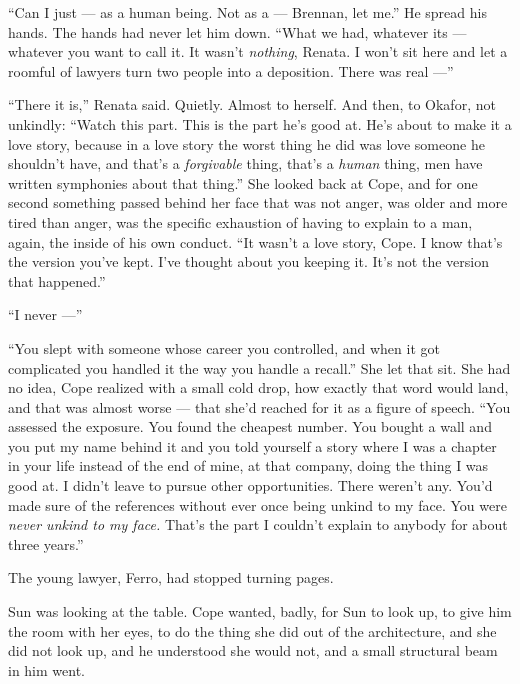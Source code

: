 \documentclass[11pt,openany]{book}
\newcommand{\scenebreak}{\par\vspace{0.5\baselineskip}\begin{center}\textasteriskcentered\quad\textasteriskcentered\quad\textasteriskcentered\end{center}\vspace{0.5\baselineskip}\par}
\begin{document}
``Can I just --- as a human being. Not as a --- Brennan, let me.'' He spread his hands. The hands had never let him down. ``What we had, whatever its --- whatever you want to call it. It wasn't \textit{nothing}, Renata. I won't sit here and let a roomful of lawyers turn two people into a deposition. There was real ---''

``There it is,'' Renata said. Quietly. Almost to herself. And then, to Okafor, not unkindly: ``Watch this part. This is the part he's good at. He's about to make it a love story, because in a love story the worst thing he did was love someone he shouldn't have, and that's a \textit{forgivable} thing, that's a \textit{human} thing, men have written symphonies about that thing.'' She looked back at Cope, and for one second something passed behind her face that was not anger, was older and more tired than anger, was the specific exhaustion of having to explain to a man, again, the inside of his own conduct. ``It wasn't a love story, Cope. I know that's the version you've kept. I've thought about you keeping it. It's not the version that happened.''

``I never ---''

``You slept with someone whose career you controlled, and when it got complicated you handled it the way you handle a recall.'' She let that sit. She had no idea, Cope realized with a small cold drop, how exactly that word would land, and that was almost worse --- that she'd reached for it as a figure of speech. ``You assessed the exposure. You found the cheapest number. You bought a wall and you put my name behind it and you told yourself a story where I was a chapter in your life instead of the end of mine, at that company, doing the thing I was good at. I didn't leave to pursue other opportunities. There weren't any. You'd made sure of the references without ever once being unkind to my face. You were \textit{never unkind to my face.} That's the part I couldn't explain to anybody for about three years.''


\scenebreak


The young lawyer, Ferro, had stopped turning pages.

Sun was looking at the table. Cope wanted, badly, for Sun to look up, to give him the room with her eyes, to do the thing she did out of the architecture, and she did not look up, and he understood she would not, and a small structural beam in him went.
\end{document}
